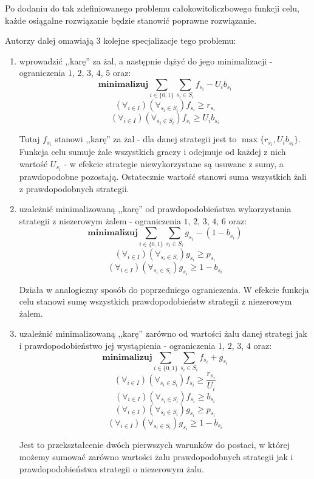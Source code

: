 \documentclass[polish]{standalone}
\begin{document}
Po dodaniu do tak zdefiniowanego problemu całokowitoliczbowego funkcji celu, każde osiągalne rozwiązanie będzie stanowić
poprawne rozwiązanie. \cite[str.~2]{SCG-NE}

Autorzy dalej omawiają 3 kolejne specjalizacje tego problemu:
\begin{enumerate}
\item wprowadzić ,,karę'' za żal, a następnie dążyć do jego minimalizacji - ograniczenia $1$, $2$, $3$, $4$, $5$ oraz:
$$\textbf{minimalizuj} \sum_{i \in \{0,1\}} \sum_{s_i \in S_i} f_{s_i} - U_i b_{s_i}$$
$$(\forall_{i \in I}) (\forall_{s_i \in S_i}) f_{s_i} \geq r_{s_i}$$
$$(\forall_{i \in I}) (\forall_{s_i \in S_i}) f_{s_i} \geq U_i b_{s_i}$$
\cite[str.~2]{SCG-NE}

Tutaj $f_{s_i}$ stanowi ,,karę'' za żal - dla danej strategii jest to $\max \{ r_{s_i}, U_i b_{s_i} \}$. Funkcja celu
sumuje żale wszystkich graczy i odejmuje od każdej z nich wartość $U_{s_i}$ - w efekcie strategie niewykorzystane są
usuwane z sumy, a prawdopodobne pozostają. Ostatecznie wartość stanowi suma wszystkich żali z prawdopodobnych strategii.
\item uzależnić minimalizowaną ,,karę'' od prawdopodobieństwa wykorzystania strategii z niezerowym żalem - ograniczenia
$1$, $2$, $3$,
$4$, $6$ oraz:
$$\textbf{minimalizuj} \sum_{i \in \{0,1\}} \sum_{s_i \in S_i} g_{s_i} - (1 - b_{s_i})$$
$$(\forall_{i \in I}) (\forall_{s_i \in S_i}) g_{s_i} \geq p_{s_i}$$
$$(\forall_{i \in I}) (\forall_{s_i \in S_i}) g_{s_i} \geq 1 - b_{s_i}$$
\cite[str.~2]{SCG-NE}

Działa w analogiczny sposób do poprzedniego ograniczenia. W efekcie funkcja celu stanowi sumę wszystkich
prawdopodobieństw strategii z niezerowym żalem.
\item uzależnić minimalizowaną ,,karę'' zarówno od wartości żalu danej strategi jak i prawdopodobieństwo jej wystąpienia
- ograniczenia $1$, $2$, $3$, $4$ oraz:
$$\textbf{minimalizuj} \sum_{i \in \{0,1\}} \sum_{s_i \in S_i} f_{s_i} + g_{s_i}$$
$$(\forall_{i \in I}) (\forall_{s_i \in S_i}) f_{s_i} \geq \frac{r_{s_i}}{U_i}$$
$$(\forall_{i \in I}) (\forall_{s_i \in S_i}) f_{s_i} \geq b_{s_i}$$
$$(\forall_{i \in I}) (\forall_{s_i \in S_i}) g_{s_i} \geq p_{s_i}$$
$$(\forall_{i \in I}) (\forall_{s_i \in S_i}) g_{s_i} \geq 1 - b_{s_i}$$
\cite[str.~2--3]{SCG-NE}

Jest to przekształcenie dwóch pierwszych warunków do postaci, w której możemy sumować zarówno wartości żalu
prawdopodobnych strategii jak i prawdopodobieństwa strategii o niezerowym żalu.
\end{enumerate}
\end{document}
